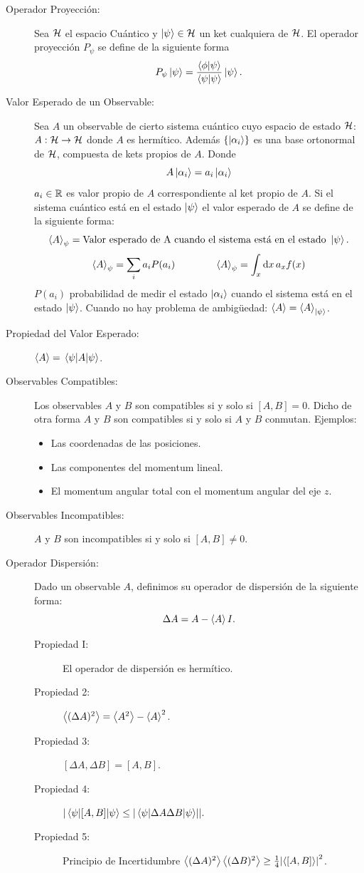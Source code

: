 \begin{description}
    \item[Operador Proyección: ] Sea $\mathcal{H}$ el espacio Cuántico y $\ket{\psi} \in \mathcal{H}$ un ket cualquiera de $\mathcal{H}$. El operador proyección $P_\psi$ se define de la siguiente forma
        $$ P_\psi \ket{\psi} = \frac{\braket{\phi}{\psi}}{\braket{\psi}} \ket{\psi} . $$ 
    \item[Valor Esperado de un Observable: ] Sea $A$ un observable de cierto sistema cuántico cuyo espacio de estado $\mathcal{H}$: $A:\mathcal{H} \to \mathcal{H}$ donde $A$ es hermítico. Además $\{ \ket{\alpha _i} \}$ es una base ortonormal de $\mathcal{H}$, compuesta de kets propios de $A$. Donde
        $$ A\ket{\alpha _i} = a_i \ket{\alpha _i} $$
    $a_i \in \mathbb{R}$ es valor propio de $A$ correspondiente al ket propio de $A$. Si el sistema cuántico está en el estado $\ket{\psi}$ el valor esperado de $A$ se define de la siguiente forma:
        $$ \expval{A} _\psi = \text{Valor esperado de A cuando el sistema está en el estado } \ket{\psi} . $$
        $$ \expval{A}_\psi = \sum_i a_i P(a_i) \qquad \qquad \expval{A}_\psi = \int _x \dd{x} a_x f(x) $$
    $P(a_i)$ probabilidad de medir el estado $\ket{\alpha _i}$ cuando el sistema está en el estado $\ket{\psi}$. Cuando no hay problema de ambigüedad:  $\expval{A} = \expval{A} _{\ket{\psi}}$.
    \item[Propiedad del Valor Esperado: ] $\expval{A} = \expval{A}{\psi}$.
    \item[Observables Compatibles: ] Los observables $A$ y $B$ son compatibles si y solo si $[A,B] = 0$. Dicho de otra forma $A$ y $B$ son compatibles si y solo si $A$ y $B$ conmutan. Ejemplos:
        \begin{itemize}
            \item Las coordenadas de las posiciones.
            \item Las componentes del momentum lineal.
            \item El momentum angular total con el momentum angular del eje $z$.
        \end{itemize}
    \item[Observables Incompatibles: ] $A$ y $B$ son incompatibles si y solo si $[A,B] \neq 0$.
    \item[Operador Dispersión: ]  Dado un observable $A$, definimos su operador de dispersión de la siguiente forma:
        $$ \Delta A = A - \expval{A} I. $$
    \begin{description}
        \item[Propiedad I: ] El operador de dispersión es hermítico. 
        \item[Propiedad 2: ] $\expval{(\Delta A)^2} = \expval{A^2} - \expval{A}^2$.
        \item[Propiedad 3: ] $[\Delta A ,\Delta B] = [A,B]$.
        \item[Propiedad 4: ] $\abs{ \expval{[A,B]}{\psi} \leq \abs{ \expval{\Delta A \Delta B}{\psi} } }.$
        \item[Propiedad 5: ] Principio de Incertidumbre $\expval{(\Delta A)^2} \expval{(\Delta B)^2} \geq \frac{1}{4} \abs{ \expval{[A,B]} }^2$.
    \end{description}
\end{description}

